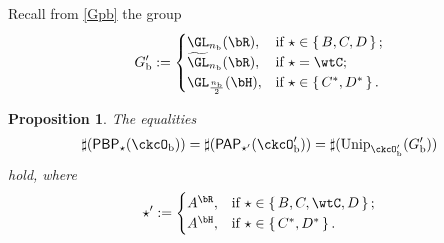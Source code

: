 \documentclass[12pt,a4paper]{amsart}
\def\abs#1{\left|{#1}\right|}
\numberwithin{equation}{section}
\newtheorem{prop}[thm]{Proposition}
\theoremstyle{remark}
\def\half{{\tfrac{1}{2}}}
\def\Unip{\mathrm{Unip}}
\def\PP{\mathsf{PAP}}
\def\cupcol{{\stackrel{c}{\sqcup}}}
\def\PBP{\mathsf{PBP}}
\def\cupcol{{\,\stackrel{c}{\sqcup}\,}}
\def\ckcOb{\ckcO_{\mathrm b}}
\def\ckcOpb{\ckcO'_{\mathrm b}}
\def\Gpb{G'_{\mathrm b}}
\begin{document}

Recall from \eqref{Gpb} the group
\[
  G'_{\mathrm b} := \begin{cases}
    \GL_{n_{\mathrm b}}(\bR), & \text{if } \star \in \set{B,C,D}; \\
    \widetilde{\GL}_{n_{\mathrm b}}(\bR), & \text{if } \star = \wtC; \\
    \GL_{\frac{n_{\mathrm b}}{2}}(\bH), & \text{if } \star \in \set{C^{*},D^{*}}.\\
  \end{cases}
\]

\begin{prop}\label{prop:BP.PP} %
  The equalities
\[
    \begin{split}
      \sharp(\PBP_{\star}(\ckcO_{\mathrm b})) = \sharp(\PP_{\star '}(\ckcO'_{\mathrm b})) = \sharp(\Unip_{\ckcO'_{\mathrm b}}(G'_{\mathrm b}))
    \end{split}
  \]
  hold, where
\begin{equation}\label{def:star'}
\star ':= \begin{cases}
    A^{\bR}, & \text{if } \star \in \set{B,C,\wtC,D}; \\
    A^{\bH}, & \text{if } \star \in \set{C^{*},D^{*}}.\\
  \end{cases}
  \end{equation}
\end{prop}
\end{document}
